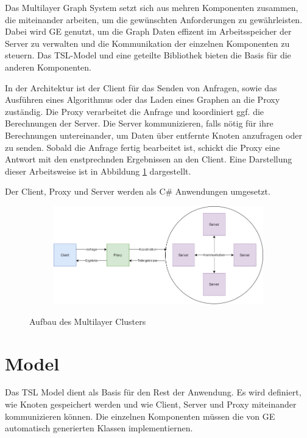 Das Multilayer Graph System setzt sich aus mehren Komponenten zusammen, die miteinander arbeiten, um die gewünschten Anforderungen zu gewährleisten.
Dabei wird GE genutzt, um die Graph Daten effizent im Arbeitsspeicher der Server zu verwalten und die Kommunikation der einzelnen Komponenten zu steuern.  Das TSL-Model und eine geteilte Bibliothek bieten die Basis für die
anderen Komponenten.

In der Architektur ist der Client für das Senden von Anfragen, sowie das Ausführen eines Algorithmus oder das Laden eines Graphen an die Proxy zuständig.
Die Proxy verarbeitet die Anfrage und koordiniert ggf. die Berechnungen der Server. Die Server kommunizieren, falls nötig für ihre Berechnungen untereinander, um Daten über entfernte Knoten anzufragen oder zu senden. Sobald die Anfrage fertig bearbeitet ist, schickt die Proxy eine Antwort mit den enstprechnden Ergebnissen an den Client.
Eine Darstellung dieser Arbeitsweise ist in Abbildung \ref{architektur} dargestellt.

Der Client, Proxy und Server werden als C\# Anwendungen umgesetzt. 

\begin{figure}
  \centering
  \begin{subfigure}[b]{1.0\textwidth}
    \includegraphics[width=1.0\linewidth]{img/Architektur-Cluster.png}
  \end{subfigure}
  \caption{Aufbau des Multilayer Clusters}
  \label{architektur}
\end{figure}



\section{Model}

Das TSL Model dient als Basis für den Rest der Anwendung. Es wird definiert, wie Knoten gespeichert werden und wie Client, Server und Proxy miteinander
kommunizieren können. Die einzelnen Komponenten müssen die von GE automatisch generierten Klassen implementiernen.


